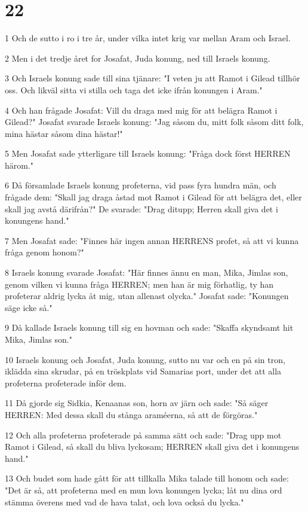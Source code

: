 \chapter{22}

\par 1 Och de sutto i ro i tre år, under vilka intet krig var mellan Aram och Israel.
\par 2 Men i det tredje året for Josafat, Juda konung, ned till Israels konung.
\par 3 Och Israels konung sade till sina tjänare: "I veten ju att Ramot i Gilead tillhör oss. Och likväl sitta vi stilla och taga det icke ifrån konungen i Aram."
\par 4 Och han frågade Josafat: Vill du draga med mig för att belägra Ramot i Gilead?" Josafat svarade Israels konung: "Jag såsom du, mitt folk såsom ditt folk, mina hästar såsom dina hästar!"
\par 5 Men Josafat sade ytterligare till Israels konung: "Fråga dock först HERREN härom."
\par 6 Då församlade Israels konung profeterna, vid pass fyra hundra män, och frågade dem: "Skall jag draga åstad mot Ramot i Gilead för att belägra det, eller skall jag avstå därifrån?" De svarade: "Drag ditupp; Herren skall giva det i konungens hand."
\par 7 Men Josafat sade: "Finnes här ingen annan HERRENS profet, så att vi kunna fråga genom honom?"
\par 8 Israels konung svarade Josafat: "Här finnes ännu en man, Mika, Jimlas son, genom vilken vi kunna fråga HERREN; men han är mig förhatlig, ty han profeterar aldrig lycka åt mig, utan allenast olycka." Josafat sade: "Konungen säge icke så."
\par 9 Då kallade Israels konung till sig en hovman och sade: "Skaffa skyndsamt hit Mika, Jimlas son."
\par 10 Israels konung och Josafat, Juda konung, sutto nu var och en på sin tron, iklädda sina skrudar, på en tröskplats vid Samarias port, under det att alla profeterna profeterade inför dem.
\par 11 Då gjorde sig Sidkia, Kenaanas son, horn av järn och sade: "Så säger HERREN: Med dessa skall du stånga araméerna, så att de förgöras."
\par 12 Och alla profeterna profeterade på samma sätt och sade: "Drag upp mot Ramot i Gilead, så skall du bliva lyckosam; HERREN skall giva det i konungens hand."
\par 13 Och budet som hade gått för att tillkalla Mika talade till honom och sade: "Det är så, att profeterna med en mun lova konungen lycka; låt nu dina ord stämma överens med vad de hava talat, och lova också du lycka."
